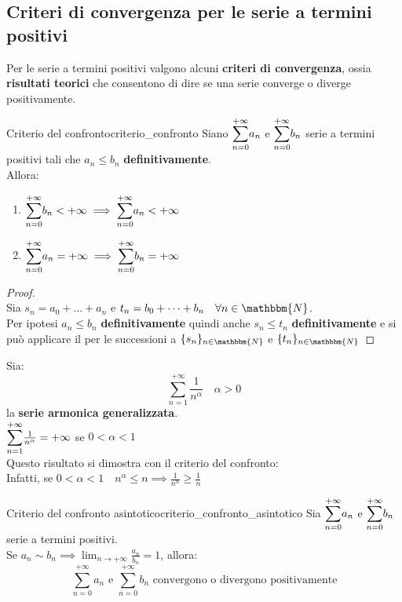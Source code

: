 \documentclass[12pt]{report}
\newcounter{theorem}
\newcommand{\namerefl}[1]{%
	\bgroup
	\let\nmu\MakeLowercase
	\nameref{#1}\egroup}
\newcommand{\nmu}{}
\begin{document}
 		\subsection{Criteri di convergenza per le serie a termini positivi}
 		Per le serie a termini positivi valgono alcuni \textbf{criteri di convergenza}, ossia \textbf{risultati teorici} che consentono di dire se una serie converge o diverge positivamente.
 		\begin{theorem}{\nmu Criterio del confronto}{criterio_confronto}
 			Siano $\mathlarger{\sum_{n=0}^{+\infty}}a_n$ e $\mathlarger{\sum_{n=0}^{+\infty}}b_n$ serie a termini positivi tali che $a_n \leq b_n$ \textbf{definitivamente}. \\
 			Allora:
 			\begin{enumerate}[label=(\arabic*)]
 				\item $\mathlarger{\sum_{n=0}^{+\infty}}b_n < +\infty \implies \mathlarger{\sum_{n=0}^{+\infty}}a_n < +\infty$
 				\item $\mathlarger{\sum_{n=0}^{+\infty}}a_n = +\infty \implies \mathlarger{\sum_{n=0}^{+\infty}}b_n = +\infty$
 			\end{enumerate}
 			\begin{proof} \quad \\
 				Sia $s_n = a_0 + \dots + a_n$ e $t_n = b_0 + \dots + b_n \quad \forall n \in \mathbbm{N}$. \\
 				Per ipotesi $a_n \leq b_n$ \textbf{definitivamente} quindi anche $s_n \leq t_n$ \textbf{definitivamente} e si può applicare il \namerefl{th:confronto_succ} per le successioni a $\{s_n\}_{n \in \mathbbm{N}}$ e $\{t_n\}_{n \in \mathbbm{N}}$
 			\end{proof}
 		\end{theorem}
 		\begin{example}{}{}
 			Sia:
 			\[
 			\sum_{n=1}^{+\infty}\frac{1}{n^\alpha} \quad \alpha > 0
 			\]
 			la \textbf{serie armonica generalizzata}. \\
 			$\mathlarger{\sum_{n=1}^{+\infty}}\frac{1}{n^\alpha}=+\infty$ se $0 < \alpha < 1$ \\
 			Questo risultato si dimostra con il criterio del confronto: \\
 			Infatti, se $0 < \alpha < 1 \quad n^\alpha \leq n \implies \frac{1}{n^\alpha} \geq \frac{1}{n}$
 		\end{example}
 		\begin{theorem}{\nmu Criterio del confronto asintotico}{criterio_confronto_asintotico}
 			Sia $\mathlarger{\sum_{n=0}^{+\infty}}a_n$ e $\mathlarger{\sum_{n=0}^{+\infty}}b_n$ serie a termini positivi. \\
 			Se $a_n \sim b_n \implies \lim_{n \to +\infty}\frac{a_n}{b_n} = 1$, allora:
 			\[
 			\sum_{n=0}^{+\infty}a_n \text{ e } \sum_{n=0}^{+\infty}b_n \text{ convergono o divergono positivamente}
 			\]
 		\end{theorem}
\end{document}
